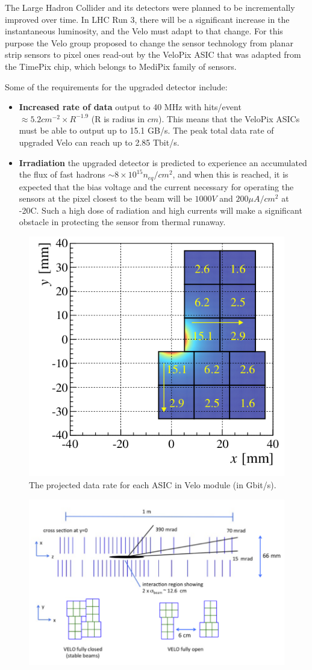 The Large Hadron Collider and its detectors were planned to be incrementally
improved over time. In LHC Run 3, there will be a significant increase
in the instantaneous luminosity, and the Velo must adapt to that change. For this purpose the Velo group proposed to change the sensor technology from planar strip sensors to pixel ones
read-out by the VeloPix ASIC that was adapted from the TimePix chip, which belongs to MediPix family of sensors.

Some of the requirements for the upgraded detector include:
\begin{itemize}
\item \textbf{Increased rate of data} output to 40 MHz with hits/event $≈ 5.2cm^{-2} \times R^{−1.9}$ (R is radius in $cm$).
This means that the VeloPix ASICs must be able to output up to 15.1 GB/s. The peak total data rate of upgraded Velo can reach up to 2.85 Tbit/s.
\item \textbf{Irradiation} the upgraded detector is predicted to experience an accumulated the flux of fast hadrons
$∼ 8 \times 10^{15}n_{eq} /cm^{2}$, and when this is reached, it is expected that the bias voltage and the current necessary for operating the sensors at the pixel closest to the beam will be $1000V$ and $200 \mu A/cm^{2}$ at -20C.
Such a high dose of radiation and high currents will make a significant obstacle in protecting the sensor from thermal runaway.
\end{itemize}


\begin{figure}
  \centering
  \includegraphics[width=0.4\linewidth]{figures/chapter2/data_rate.png}
  \caption{The projected data rate for each ASIC in Velo module (in Gbit/s).}
  \label{fig:velopix_datarate}
\end{figure}
\begin{figure}
  \centering
  \includegraphics[width=0.7\linewidth]{figures/chapter2/velopix_layout.png}
  \caption{  }
  \label{fig:velopix_layout}
\end{figure}

